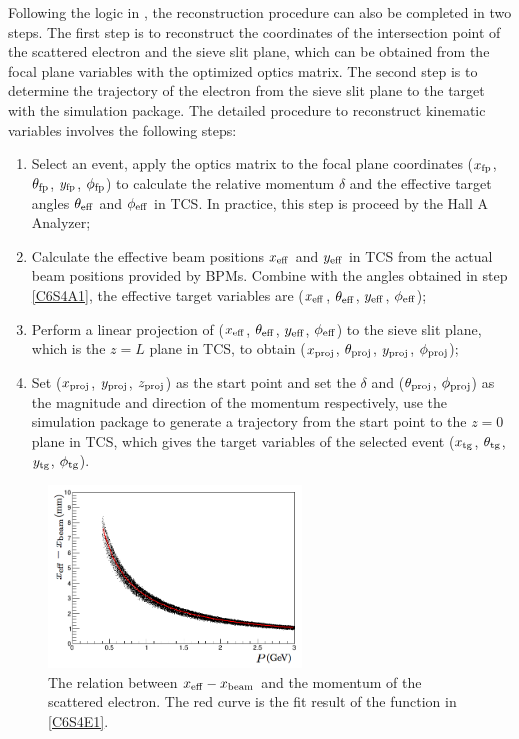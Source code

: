 Following the logic in , the reconstruction procedure can also be completed in two steps. The first step is to reconstruct the coordinates of the intersection point of the scattered electron and the sieve slit plane, which can be obtained from the focal plane variables with the optimized optics matrix. The second step is to determine the trajectory of the electron from the sieve slit plane to the target with the simulation package. The detailed procedure to reconstruct kinematic variables involves the following steps:
\begin{enumerate}[parsep=0pt]
\item \label{C6S4A1}Select an event, apply the optics matrix to the focal plane coordinates ($x_{\mathrm{fp}}$, $\theta_{\mathrm{fp}}$, $y_{\mathrm{fp}}$, $\phi_{\mathrm{fp}}$) to calculate the relative momentum $\delta$ and the effective target angles $\theta_{\mathrm{eff}}$ and $\phi_{\mathrm{eff}}$ in TCS. In practice, this step is proceed by the Hall A Analyzer;
\item \label{C6S4A2}Calculate the effective beam positions $x_{\mathrm{eff}}$ and $y_{\mathrm{eff}}$ in TCS from the actual beam positions provided by BPMs. Combine with the angles obtained in step \ref{C6S4A1}, the effective target variables are ($x_{\mathrm{eff}}$, $\theta_{\mathrm{eff}}$, $y_{\mathrm{eff}}$, $\phi_{\mathrm{eff}}$);
\item Perform a linear projection of ($x_{\mathrm{eff}}$, $\theta_{\mathrm{eff}}$, $y_{\mathrm{eff}}$, $\phi_{\mathrm{eff}}$) to the sieve slit plane, which is the $z=L$ plane in TCS, to obtain ($x_{\mathrm{proj}}$, $\theta_{\mathrm{proj}}$, $y_{\mathrm{proj}}$, $\phi_{\mathrm{proj}}$);
\item Set ($x_{\mathrm{proj}}$, $y_{\mathrm{proj}}$, $z_{\mathrm{proj}}$) as the start point and set the $\delta$ and ($\theta_{\mathrm{proj}}$, $\phi_{\mathrm{proj}}$) as the magnitude and direction of the momentum respectively, use the simulation package to generate a trajectory from the start point to the $z=0$ plane in TCS, which gives the target variables of the selected event ($x_{\mathrm{tg}}$, $\theta_{\mathrm{tg}}$, $y_{\mathrm{tg}}$, $\phi_{\mathrm{tg}}$).
\end{enumerate}

\begin{figure}[b!]
  \centering
  \includegraphics[width=0.6\textwidth]{figs/effective-x-fit.png}
  \caption[Determine the effective beam position correction.]{The relation between $x_{\mathrm{eff}}-x_{\mathrm{beam}}$ and the momentum of the scattered electron. The red curve is the fit result of the function in \cref{C6S4E1}. \label{C6S4F2}}
\end{figure}

